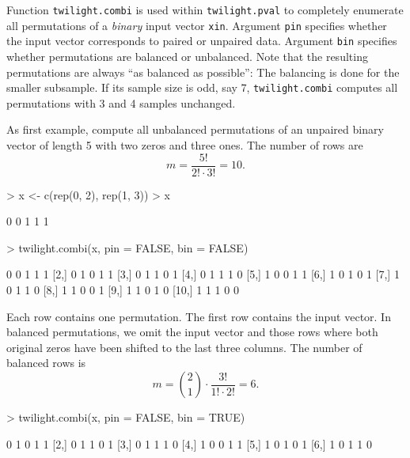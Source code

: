 \documentclass[11pt,a4paper,fleqn]{report}
\newcommand{\Rfunction}[1]{{\texttt{#1}}}
\newcommand{\Rfunarg}[1]{{\texttt{#1}}}
\begin{document}
Function \Rfunction{twilight.combi} is used within \Rfunction{twilight.pval} to completely enumerate all permutations of a \textit{binary} input vector \Rfunarg{xin}. Argument \Rfunarg{pin} specifies whether the input vector corresponds to paired or unpaired data. Argument \Rfunarg{bin} specifies whether permutations are balanced or unbalanced. Note that the resulting permutations are always ``as balanced as possible'': The balancing is done for the smaller subsample. If its sample size is odd, say 7, \Rfunction{twilight.combi} computes all permutations with 3 and 4 samples unchanged.

As first example, compute all unbalanced permutations of an unpaired binary vector of length 5 with two zeros and three ones. The number of rows are 
\begin{equation}
m = \frac{5!}{2! \cdot 3!} = 10.
\end{equation}
\begin{Schunk}
\begin{Sinput}
> x <- c(rep(0, 2), rep(1, 3))
> x
\end{Sinput}
\begin{Soutput}
[1] 0 0 1 1 1
\end{Soutput}
\end{Schunk}
\begin{Schunk}
\begin{Sinput}
> twilight.combi(x, pin = FALSE, bin = FALSE)
\end{Sinput}
\begin{Soutput}
      [,1] [,2] [,3] [,4] [,5]
 [1,]    0    0    1    1    1
 [2,]    0    1    0    1    1
 [3,]    0    1    1    0    1
 [4,]    0    1    1    1    0
 [5,]    1    0    0    1    1
 [6,]    1    0    1    0    1
 [7,]    1    0    1    1    0
 [8,]    1    1    0    0    1
 [9,]    1    1    0    1    0
[10,]    1    1    1    0    0
\end{Soutput}
\end{Schunk}
Each row contains one permutation. The first row contains the input vector. In balanced permutations, we omit the input vector and those rows where both original zeros have been shifted to the last three columns. The number of balanced rows is
\begin{equation}
m = {2 \choose 1} \cdot \frac{3!}{1! \cdot 2!} = 6.
\end{equation}
\begin{Schunk}
\begin{Sinput}
> twilight.combi(x, pin = FALSE, bin = TRUE)
\end{Sinput}
\begin{Soutput}
     [,1] [,2] [,3] [,4] [,5]
[1,]    0    1    0    1    1
[2,]    0    1    1    0    1
[3,]    0    1    1    1    0
[4,]    1    0    0    1    1
[5,]    1    0    1    0    1
[6,]    1    0    1    1    0
\end{Soutput}
\end{Schunk}
\end{document}
